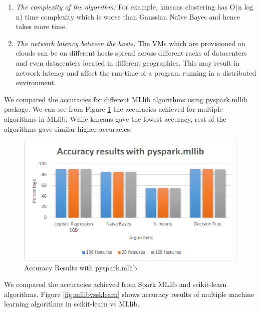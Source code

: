 \documentclass[9pt,twocolumn,twoside]{styles/osajnl}
\begin{document}
\begin{enumerate}
 \item \textit{The complexity of the algorithm:} For example,  kmeans clustering has  O(n log n) time complexity which is worse than Gaussian Naïve Bayes and hence takes more time.

 \item \textit{The network latency between the hosts:} The VMs which are provisioned on clouds can be on different hosts spread across different racks of datacenters and even datacenters located in different geographies. This may result in network latency and affect the run-time of a program running in a distributed environment.
\end{enumerate}

We compared the accuracies for different MLlib algorithms using pyspark.mllib package. We can see from Figure \ref{fig:accmllib} the accuracies achieved for multiple algorithms in MLlib. While kmeans gave the lowest accuracy, rest of the algorithms gave similar higher accuracies.

\begin{figure}[h]
\centering
\includegraphics[width=\linewidth]{images/accmllib.png}
\caption{Accuracy Results with pyspark.mllib}
\label{fig:accmllib}
\end{figure}

We compared the accuracies achieved from Spark MLlib and scikit-learn algorithms. Figure \ref{fig:mllibvssklearn} shows accuracy results of multiple machine learning algorithms in scikit-learn vs MLlib.
\end{document}
